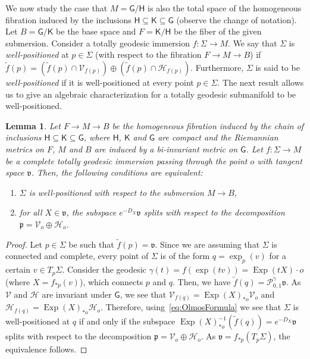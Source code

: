 \documentclass[11pt,a4paper,final]{amsart}
\newcommand{\s}{\mathsf}
\newcommand{\g}{\mathfrak}
\newcommand{\Exp}{\operatorname{Exp}}
\renewcommand{\tilde}{\widetilde}
\newtheorem{lemma}[theorem]{Lemma}
\theoremstyle{definition}
\begin{document}
We now study the case that $M=\s{G}/\s{H}$ is also the total space of the homogeneous fibration induced by the inclusions $\s{H}\subseteq \s{K}\subseteq \s{G}$ (observe the change of notation).
Let $B=\s{G}/\s{K}$ be the base space and $F=\s{K}/\s{H}$ be the fiber of the given submersion.
Consider a totally geodesic immersion $f\colon\Sigma\to M$.
We say that $\Sigma$ is \textit{well-positioned} at $p\in \Sigma$ (with respect to the fibration $F \to M\to B$) if $\tilde{f}(p)=\left(\tilde{f}(p) \cap \mathcal{V}_{f(p)}\right)\oplus\left(\tilde{f}(p) \cap \mathcal{H}_{f(p)}\right)$.
Furthermore, $\Sigma$ is said to be \textit{well-positioned} if it is well-positioned at every point $p\in \Sigma$.
The next result allows us to give an algebraic characterization for a totally geodesic submanifold to be well-positioned.

\begin{lemma}\label{lemma:HomogeneousFibrationWellPositioned}
	Let $F\to M \to B$ be the homogeneous fibration induced by the chain of inclusions $\s{H}\subseteq \s{K}\subseteq \s{G}$, where $\s{H}$, $\s{K}$ and $\s{G}$ are compact and the Riemannian metrics on $F$, $M$ and $B$ are induced by a bi-invariant metric on $\s{G}$.
	Let $f\colon\Sigma\to M$ be a complete totally geodesic immersion passing through the point $o$ with tangent space $\g{v}$.
	Then, the following conditions are equivalent:
	\begin{enumerate}[\rm (i)]
		\item $\Sigma$ is well-positioned with respect to the submersion $M\to B$,
		\item for all $X\in \g{v}$, the subspace $e^{-D_{X}}\g{v}$ splits with respect to the decomposition $\g{p}=\mathcal{V}_{o}\oplus\mathcal{H}_{o}$.
	\end{enumerate}		
\end{lemma}
\begin{proof}
	Let $p\in\Sigma$ be such that $\tilde{f}(p)=\g{v}$.
	Since we are assuming that $\Sigma$ is connected and complete, every point of $\Sigma$ is of the form $q=\exp_{p}(v)$ for a certain $v\in T_{p}\Sigma$.
	Consider the geodesic $\gamma(t)=f(\exp(tv))=\Exp(tX)\cdot o$ (where $X=f_{*p}(v)$), which connects $p$ and $q$.
	Then, we have $\tilde{f}(q)=\mathcal{P}_{0,1}^{\gamma}\g{v}$.
	As $\mathcal{V}$ and $\mathcal{H}$ are invariant under $\s{G}$, we see that $\mathcal{V}_{f(q)}=\Exp(X)_{*o}\mathcal{V}_{o}$ and $\mathcal{H}_{f(q)}=\Exp(X)_{*o}\mathcal{H}_{o}$.
	Therefore, using~\eqref{eq:OlmosFormula} we see that $\Sigma$ is well-positioned at $q$ if and only if the subspace
	$\Exp(X)_{*o}^{-1}(\tilde{f}(q))=e^{-D_{X}}\g{v}$
	splits with respect to the decomposition $\g{p}=\mathcal{V}_{o}\oplus\mathcal{H}_{o}$.
	As $\g{v}=f_{*p}(T_{p}\Sigma)$, the equivalence follows. \qedhere
\end{proof}
\end{document}
